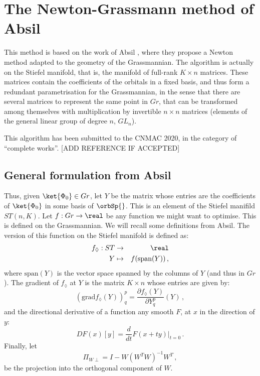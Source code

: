 \documentclass[a4paper,11pt]{article}
\begin{document}
\newpage
\section{The Newton-Grassmann method of Absil}

This method is based on the work of Absil \etal{}, where they propose a Newton method adapted to the geometry of the Grassmannian.
The algorithm is actually on the Stiefel manifold, that is, the manifold of full-rank $K \times n$ matrices.
These matrices contain the coefficients of the orbitals in a fixed basis, and thus form a redundant parametrisation for the Grassmannian, in the sense that there are several matrices to represent the same point in $Gr$, that can be transformed among themselves with multiplication by invertible $n \times n$ matrices (elements of the general linear group of degree $n$, $GL_n$).

This algorithm has been submitted to the CNMAC 2020, in the category of ``complete works''. [ADD REFERENCE IF ACCEPTED]

\subsection{General formulation from Absil}

Thus, given $\ket{\Phi_0} \in Gr$, let $Y$ be the matrix whose entries are the coefficients of $\ket{\Phi_0}$ in some basis of $\orbSp{}$.
This is an element of the Stiefel manifild $ST(n,K)$.
Let $f : Gr \to \real$ be any function we might want to optimise.
This is defined on the Grassmannian.
We will recall some definitions from Absil.\cite{}
The version of this function on the Stiefel manifold is defined as:
\begin{eqnarray}
  f_{\lozenge} : ST &\to& \real\\
  Y &\mapsto& f(\text{span}(Y))\,,
\end{eqnarray}
where $\text{span}(Y)$ is the vector space spanned by the columns of $Y$ (and thus in $Gr$).
The gradient of $f_\lozenge$ at $Y$ is the matrix $K \times n$ whose entries are given by:
\begin{equation}
(\text{grad} f_\lozenge(Y))^p_q = \frac{\partial f_\lozenge(Y)}{\partial Y^p_q}(Y)\,,
\end{equation}
and the directional derivative of a function any smooth $F$, at $x$ in the direction of $y$:
\begin{equation}
  DF(x)[y] = \frac{d}{dt}F(x + ty)\big|_{t=0}\,.
\end{equation}
Finally, let
\begin{equation}
  \Pi_{W\perp} = I - W(W^TW)^{-1}W^T\,,
\end{equation}
be the projection into the orthogonal component of $W$.
\end{document}
